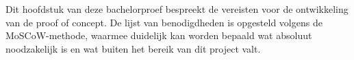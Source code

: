 
\chapter{}%
\label{ch:methodologie}

%
%
%
%
%      
%  
%
%
Dit hoofdstuk van deze bachelorproef bespreekt de vereisten voor de ontwikkeling van de proof of concept. De lijst van benodigdheden is opgesteld volgens de MoSCoW-methode, waarmee duidelijk kan worden bepaald wat absoluut noodzakelijk is en wat buiten het bereik van dit project valt.

